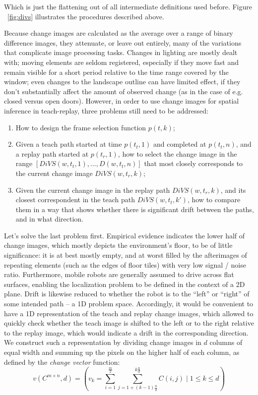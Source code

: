 \documentclass[twocolumn, 9pt,fleqn]{jsproceedings}
\begin{document}
Which is just the flattening out of all intermediate definitions used before. Figure ~\ref{fig:divs} illustrates the procedures described above.

Because change images are calculated as the average over a range of binary difference images, they attenuate, or leave out entirely, many of the variations that complicate image processing tasks. Changes in lighting are mostly dealt with; moving elements are seldom registered, especially if they move fast and remain visible for a short period relative to the time range covered by the window; even changes to the landscape outline can have limited effect, if they don't substantially affect the amount of observed change (as in the case of e.g. closed versus open doors). However, in order to use change images for spatial inference in teach-replay, three problems still need to be addressed:

\begin{enumerate}
\item How to design the frame selection function $p(t, k)$;
\item Given a teach path started at time $p(t_t, 1)$ and completed at $p(t_t, n)$, and a replay path started at $p(t_r, 1)$, how to select the change image in the range $[DiVS(w, t_t, 1), \dotsc, D(w, t_t, n)]$ that most closely corresponds to the current change image $DiVS(w, t_r, k)$;
\item Given the current change image in the replay path $DiVS(w, t_r, k)$, and its closest correspondent in the teach path $DiVS(w, t_t, k')$, how to compare them in a way that shows whether there is significant drift between the paths, and in what direction.
\end{enumerate}

Let's solve the last problem first. Empirical evidence indicates the lower half of change images, which mostly depicts the environment's floor, to be of little significance: it is at best mostly empty, and at worst filled by the afterimages of repeating elements (such as the edges of floor tiles) with very low signal / noise ratio. Furthermore, mobile robots are generally assumed to drive across flat surfaces, enabling the localization problem to be defined in the context of a 2D plane. Drift is likewise reduced to whether the robot is to the ``left'' or ``right'' of some intended path -- a 1D problem space. Accordingly, it would be convenient to have a 1D representation of the teach and replay change images, which allowed to quickly check whether the teach image is shifted to the left or to the right relative to the replay image, which would indicate a drift in the corresponding direction. We construct such a representation by dividing change images in $d$ columns of equal width and summing up the pixels on the higher half of each column, as defined by the \textit{change vector} function:
\begin{equation}
v(C^{m \times n}, d) = (v_k = \sum_{i=1}^{\frac{m}{2}} {\sum_{j=1 + (k - 1)\frac{n}{d}}^{k\frac{n}{d}}{C(i, j)}} \; | \; 1 \leq k \leq d)
\end{equation}
\end{document}
